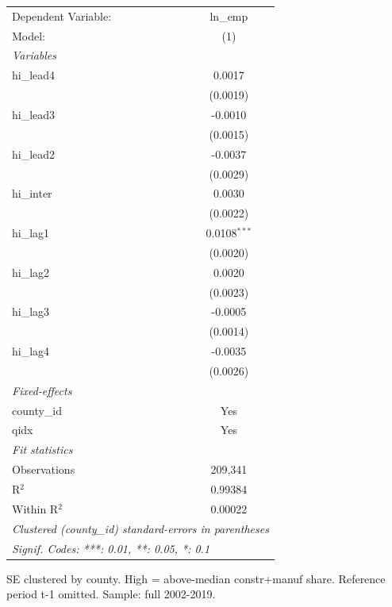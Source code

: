 
\begingroup
\centering
\begin{tabular}{lc}
   \tabularnewline \midrule \midrule
   Dependent Variable: & ln\_emp\\   
   Model:              & (1)\\  
   \midrule
   \emph{Variables}\\
   hi\_lead4           & 0.0017\\   
                       & (0.0019)\\   
   hi\_lead3           & -0.0010\\   
                       & (0.0015)\\   
   hi\_lead2           & -0.0037\\   
                       & (0.0029)\\   
   hi\_inter           & 0.0030\\   
                       & (0.0022)\\   
   hi\_lag1            & 0.0108$^{***}$\\   
                       & (0.0020)\\   
   hi\_lag2            & 0.0020\\   
                       & (0.0023)\\   
   hi\_lag3            & -0.0005\\   
                       & (0.0014)\\   
   hi\_lag4            & -0.0035\\   
                       & (0.0026)\\   
   \midrule
   \emph{Fixed-effects}\\
   county\_id          & Yes\\  
   qidx                & Yes\\  
   \midrule
   \emph{Fit statistics}\\
   Observations        & 209,341\\  
   R$^2$               & 0.99384\\  
   Within R$^2$        & 0.00022\\  
   \midrule \midrule
   \multicolumn{2}{l}{\emph{Clustered (county\_id) standard-errors in parentheses}}\\
   \multicolumn{2}{l}{\emph{Signif. Codes: ***: 0.01, **: 0.05, *: 0.1}}\\
\end{tabular}
 
\par \raggedright 
SE clustered by county. High = above-median constr+manuf share. Reference period t-1 omitted. Sample: full 2002-2019.
\par\endgroup



